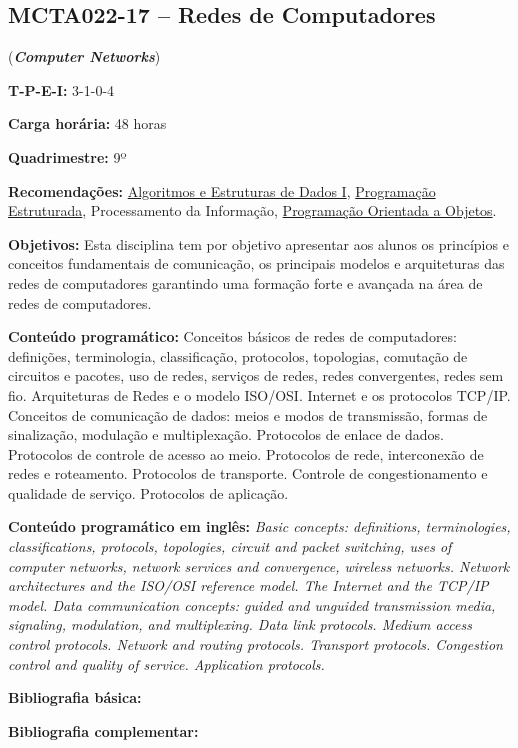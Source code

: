 \documentclass[class=article, crop=false]{standalone}
\begin{document}
\subsection*{MCTA022-17 -- Redes de Computadores}
\label{disc:redes}

(\textbf{\textit{Computer Networks}})

\begin{center}
    \begin{minipage}{0.85\textwidth}
        \textbf{T-P-E-I:} 3-1-0-4
        
        \textbf{Carga horária:} 48 horas
        
        \textbf{Quadrimestre:} 9º
        
        \textbf{Recomendações:} 
        \hyperref[disc:aedI]{Algoritmos e Estruturas de Dados I},
        \hyperref[disc:pe]{Programação Estruturada},
        Processamento da Informação, 
        \hyperref[disc:poo]{Programação Orientada a Objetos}.
    \end{minipage}
\end{center}

\textbf{Objetivos:}
Esta disciplina tem por objetivo apresentar aos alunos os princípios e
conceitos fundamentais de comunicação, os principais modelos e arquiteturas das
redes de computadores garantindo uma formação forte e avançada na área de redes
de computadores. 

\textbf{Conteúdo programático:}
Conceitos básicos de redes de computadores: definições, terminologia,
classificação, protocolos, topologias, comutação de circuitos e pacotes, uso de
redes, serviços de redes, redes convergentes, redes sem fio. 
Arquiteturas de Redes e o modelo ISO/OSI. 
Internet e os protocolos TCP/IP. 
Conceitos de comunicação de dados: meios e modos de transmissão, formas de
sinalização, modulação e multiplexação. 
Protocolos de enlace de dados. 
Protocolos de controle de acesso ao meio. 
Protocolos de rede, interconexão de redes e roteamento. 
Protocolos de transporte. 
Controle de congestionamento e qualidade de serviço. 
Protocolos de aplicação. 

\textbf{Conteúdo programático em inglês:}
\textit{Basic concepts: definitions, terminologies, classifications, protocols, topologies, circuit and packet switching, uses of computer networks, network services and convergence, wireless networks.
Network architectures and the ISO/OSI reference model. 
The Internet and the TCP/IP model. 
Data communication concepts: guided and unguided transmission media, signaling, modulation, and multiplexing. 
Data link protocols. 
Medium access control protocols. 
Network and routing protocols. 
Transport protocols. 
Congestion control and quality of service. 
Application protocols.}

\newrefsection
\textbf{Bibliografia básica:}
\nocite{2003-tanenbaum, 2008-fourozan, 2010-kurose}
\printbibliography

\newrefsection
\textbf{Bibliografia complementar:}
\nocite{2005-halsall, 2007-comer, 2005-stallings, 2007-peterson, 2011-souza}
\printbibliography
\end{document}
